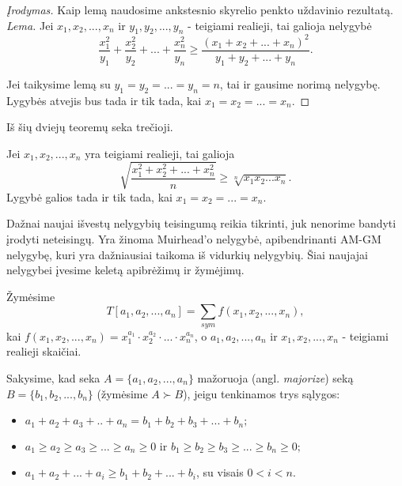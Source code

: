 \begin{proof}[Įrodymas]
  Kaip lemą naudosime ankstesnio skyrelio penkto uždavinio rezultatą. \\
  \textit{Lema.} Jei $x_{1},x_{2},...,x_{n}$ ir $y_{1},y_{2},...,y_{n}$ -
  teigiami realieji, tai galioja nelygybė
  $$\frac{x_{1}^2}{y_{1}}+\frac{x_{2}^2}{y_{2}}+...+\frac{x_{n}^2}{y_{n}}
  \geq \frac{(x_{1}+x_{2}+...+x_{n})^2}{y_{1}+y_{2}+...+y_{n}}.$$

  Jei taikysime lemą su $y_{1}=y_{2}=...=y_{n}=n$, tai ir gausime norimą
  nelygybę. Lygybės atvejis bus tada ir tik tada, kai
  $x_{1}=x_{2}=...=x_{n}$.
\end{proof}

Iš šių dviejų teoremų seka trečioji.

\begin{thm}[SM-GM nelygybė]
  Jei $x_{1},x_{2},...,x_{n}$ yra teigiami realieji, tai galioja
  $$\sqrt{\frac{x_{1}^2+x_{2}^2+...+x_{n}^2}{n}}\geq
  \sqrt[n]{x_{1}x_{2}...x_{n}}.$$ Lygybė galios tada ir tik tada, kai
  $x_{1}=x_{2}=...=x_{n}$.
\end{thm}

Dažnai naujai išvestų nelygybių teisingumą reikia tikrinti, juk nenorime
bandyti įrodyti neteisingų. Yra žinoma Muirhead'o nelygybė,
apibendrinanti AM-GM nelygybę, kuri yra dažniausiai taikoma iš vidurkių
nelygybių. Šiai naujajai nelygybei įvesime keletą apibrėžimų ir žymėjimų.

\begin{api} Žymėsime $$T[a_1,a_2,...,a_n]=\sum_{sym}{f(x_1,x_2,...,x_n)},$$
  kai $f(x_1,x_2,...,x_n)=x_1^{a_1}\cdot x_2^{a_2}\cdot...\cdot x_n^{a_n}$, o
  $a_1,a_2,...,a_n$ ir $x_1,x_2,...,x_n$ - teigiami realieji
  skaičiai.
\end{api}

\begin{api} Sakysime, kad seka $A=\{a_1,a_2,...,a_n\}$ mažoruoja (angl. \emph{majorize})
  seką $B=\{b_1,b_2,...,b_n\}$ (žymėsime $A \succ B$), jeigu tenkinamos trys
  sąlygos:
  \begin{itemize}
    \item $a_1+a_2+a_3+..+a_n=b_1+b_2+b_3+...+b_n;$
    \item $a_1\geq a_2\geq a_3 \geq ... \geq a_n\geq 0$ ir $b_1\geq b_2\geq
      b_3\geq...\geq b_n\geq0;$
    \item $a_1+a_2+...+a_i\geq b_1+b_2+...+b_i$, su visais $0<i<n$.
  \end{itemize}
\end{api}

